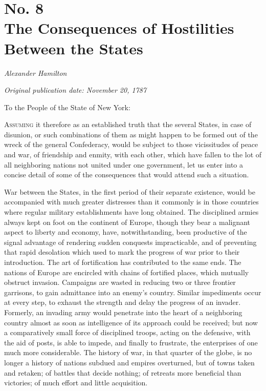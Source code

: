 \chapter[No. 8: The Consequences of Hostilities Between the States]{No. 8\\ {\small The Consequences of Hostilities Between the States}}

\textit{Alexander Hamilton}

\textit{Original publication date: November 20, 1787}
\vspace{1cm}

To the People of the State of New York:
\vspace{.4cm}

\textsc{Assuming} it therefore as an established truth that the several States, in case of disunion, or such combinations of them as might happen to be formed out of the wreck of the general Confederacy, would be subject to those vicissitudes of peace and war, of friendship and enmity, with each other, which have fallen to the lot of all neighboring nations not united under one government, let us enter into a concise detail of some of the consequences that would attend such a situation.

War between the States, in the first period of their separate existence, would be accompanied with much greater distresses than it commonly is in those countries where regular military establishments have long obtained. 
The disciplined armies always kept on foot on the continent of Europe, though they bear a malignant aspect to liberty and economy, have, notwithstanding, been productive of the signal advantage of rendering sudden conquests impracticable, and of preventing that rapid desolation which used to mark the progress of war prior to their introduction. 
The art of fortification has contributed to the same ends. 
The nations of Europe are encircled with chains of fortified places, which mutually obstruct invasion. 
Campaigns are wasted in reducing two or three frontier garrisons, to gain admittance into an enemy's country. 
Similar impediments occur at every step, to exhaust the strength and delay the progress of an invader. 
Formerly, an invading army would penetrate into the heart of a neighboring country almost as soon as intelligence of its approach could be received; but now a comparatively small force of disciplined troops, acting on the defensive, with the aid of posts, is able to impede, and finally to frustrate, the enterprises of one much more considerable. 
The history of war, in that quarter of the globe, is no longer a history of nations subdued and empires overturned, but of towns taken and retaken; of battles that decide nothing; of retreats more beneficial than victories; of much effort and little acquisition.

